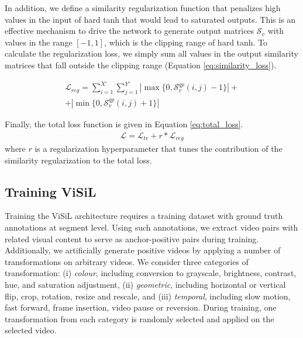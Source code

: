 \documentclass[10pt,twocolumn,letterpaper]{article}
\begin{document}
In addition, we define a similarity regularization function that penalizes high values in the input of hard tanh that would lead to saturated outputs. This is an effective mechanism to drive the network to generate output matrices $\mathcal{S}_v$ with values in the range $[-1, 1]$, which is the clipping range of hard tanh. To calculate the regularization loss, we simply sum all values in the output similarity matrices that fall outside the clipping range (Equation \ref{eq:similarity_loss}).

\begin{equation}
    \begin{aligned}
        \mathcal{L}_{reg} = \sum_{i=1}^{X'}\sum_{j=1}^{Y'} |\max\{0, \mathcal{S}_v^{qp}(i,j)-1\}|  +\\
          + |\min\{0, \mathcal{S}_v^{qp}(i,j)+1\}|
\end{aligned}
    \label{eq:similarity_loss}
\end{equation}


Finally, the total loss function is given in Equation \ref{eq:total_loss}.
\begin{equation}
    \begin{aligned}
        \mathcal{L} = \mathcal{L}_{tr} + r * \mathcal{L}_{reg}
    \end{aligned}
    \label{eq:total_loss}
\end{equation}
where $r$ is a regularization hyperparameter that tunes the contribution of the similarity regularization to the total loss.




\subsection{Training ViSiL}
\label{sec:training_process}

Training the ViSiL architecture requires a training dataset with ground truth annotations at segment level. Using such annotations, we extract video pairs with related visual content to serve as anchor-positive pairs during training. Additionally, we artificially generate positive videos by applying a number of transformations on arbitrary videos. 
We consider three categories of transformation: (i) \textit{colour}, including conversion to grayscale, brightness, contrast, hue, and saturation adjustment, (ii) \textit{geometric}, including horizontal or vertical flip, crop, rotation, resize and rescale, and (iii) \textit{temporal}, including slow motion, fast forward, frame insertion, video pause or reversion. During training, one transformation from each category is randomly selected and applied on the selected video.
\end{document}
